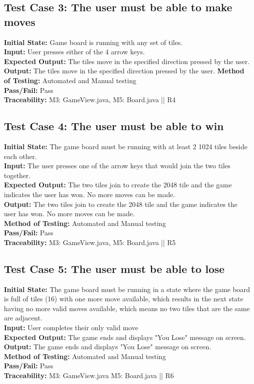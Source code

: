 \documentclass[12pt]{article}
\begin{document}
\subsection{Test Case 3: The user must be able to make moves}

\textbf{Initial State:} Game board is running with any set of tiles.\\
\textbf{Input:} User presses either of the 4 arrow keys.\\
\textbf{Expected Output:} The tiles move in the specified direction pressed by the user.\\
\textbf{Output:} The tiles move in the specified direction pressed by the user.
\textbf{Method of Testing:} Automated and Manual testing\\
\textbf{Pass/Fail:} Pass\\
\textbf{Traceability:} M3: GameView.java, M5: Board.java || R4

\subsection{Test Case 4: The user must be able to win}

\textbf{Initial State:} The game board must be running with at least 2 1024 tiles beside
each other.\\
\textbf{Input:} The user presses one of the arrow keys that would join the two tiles together.\\
\textbf{Expected Output:} The two tiles join to create the 2048 tile and the game indicates the user has won. No more moves can be made.\\
\textbf{Output:} The two tiles join to create the 2048 tile and the game indicates the user has won. No more moves can be made.\\
\textbf{Method of Testing:} Automated and Manual testing\\
\textbf{Pass/Fail:} Pass\\
\textbf{Traceability:} M3: GameView.java, M5: Board.java || R5

\subsection{Test Case 5: The user must be able to lose}

\textbf{Initial State:} The game board must be running in a state where the game board is full of tiles (16) with one more move available, which results in the next state having no more valid moves available, which means no two tiles that are the same are adjacent.\\
\textbf{Input:} User completes their only valid move\\
\textbf{Expected Output:} The game ends and displays "You Lose" message on screen.\\
\textbf{Output:} The game ends and displays "You Lose" message on screen.\\
\textbf{Method of Testing:} Automated and Manual testing\\
\textbf{Pass/Fail:} Pass\\
\textbf{Traceability:} M3: GameView.java M5: Board.java || R6
\end{document}
